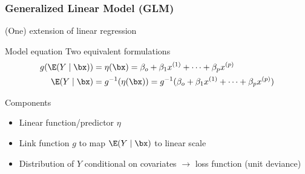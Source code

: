 \begin{frame}
	\frametitle{Generalized Linear Model (GLM)}
	\begin{block}{(One) extension of linear regression}
	\end{block}
	
	\begin{block}{Model equation}
		Two equivalent formulations
		\begin{align*}
			g(\E(Y \mid \bx)) &= \eta(\bx) = \beta_o + \beta_1 x^{(1)} + \dots + \beta_p x^{(p)} \\
			\E(Y \mid \bx) &=g^{-1}(\eta(\bx)) =  g^{-1}(\beta_o + \beta_1 x^{(1)} + \dots + \beta_p x^{(p)})
		\end{align*}
	\end{block}
	
	\begin{block}{Components}
		\begin{itemize}
			\item Linear function/predictor $\eta$
			\item Link function $g$ to map $\E(Y \mid \bx)$ to linear scale
			\item Distribution of $Y$ conditional on covariates $\rightarrow$ loss function (unit deviance)
		\end{itemize}
	\end{block}
\end{frame}

